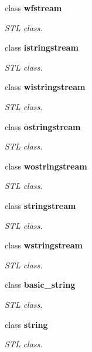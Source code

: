 \begin{DoxyCompactItemize}
class {\bfseries wfstream}
\begin{DoxyCompactList}\small\item\em STL class. \item\end{DoxyCompactList}\item 
class {\bfseries istringstream}
\begin{DoxyCompactList}\small\item\em STL class. \item\end{DoxyCompactList}\item 
class {\bfseries wistringstream}
\begin{DoxyCompactList}\small\item\em STL class. \item\end{DoxyCompactList}\item 
class {\bfseries ostringstream}
\begin{DoxyCompactList}\small\item\em STL class. \item\end{DoxyCompactList}\item 
class {\bfseries wostringstream}
\begin{DoxyCompactList}\small\item\em STL class. \item\end{DoxyCompactList}\item 
class {\bfseries stringstream}
\begin{DoxyCompactList}\small\item\em STL class. \item\end{DoxyCompactList}\item 
class {\bfseries wstringstream}
\begin{DoxyCompactList}\small\item\em STL class. \item\end{DoxyCompactList}\item 
class {\bfseries basic\_\-string}
\begin{DoxyCompactList}\small\item\em STL class. \item\end{DoxyCompactList}\item 
class {\bfseries string}
\begin{DoxyCompactList}\small\item\em STL class. \item\end{DoxyCompactList}\item 

\end{DoxyCompactItemize}
